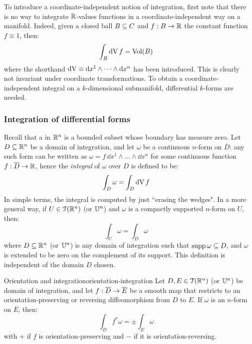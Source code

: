 To introduce a coordinate-independent notion of integration, first note that there is no way to integrate $ \mathbb{R} $-values functions in a coordinate-independent way on a manifold. Indeed, given a closed ball $ B \subseteq C $ and $ f : B \rightarrow \mathbb{R} $ the constant function $ f \equiv 1 $, then:
\begin{equation*}
  \int_B \mathrm{d} \mathrm{V} \, f = \operatorname{Vol}(B)
\end{equation*}
where the shorthand $ \mathrm{d} \mathrm{V} \equiv \mathrm{d} x^1 \wedge \dots \wedge \mathrm{d} x^n $ has been introduced.
This is clearly not invariant under coordinate transformations. To obtain a coordinate-independent integral on a $ k $-dimensional submanifold, differential $ k $-forms are needed.

\subsubsection{Integration of differential forms}

Recall that a  in $ \mathbb{R}^n $ is a bounded subset whose boundary has measure zero. Let $ D \subseteq \mathbb{R}^n $ be a domain of integration, and let $ \omega $ be a continuous $ n $-form on $ \overline{D} $: any such form can be written as $ \omega = f \, \dd x^1 \wedge \dots \wedge \dd x^n $ for some continuous function $ f : \overline{D} \rightarrow \mathbb{R} $, hence the \emph{integral} of $ \omega $ over $ D $ is defined to be:
\begin{equation*}
  \int_D \omega = \int_D \mathrm{d} \mathrm{V} \, f
\end{equation*}
In simple terms, the integral is computed by just ``erasing the wedges". In a more general way, if $ U \in \EuScript{T}(\mathbb{R}^n) $ (or $ \mathbb{U}^n $) and $ \omega $ is a compactly supported $ n $-form on $ U $, then:
\begin{equation*}
  \int_U \omega = \int_D \omega
\end{equation*}
where $ D \subseteq \mathbb{R}^n $ (or $ \mathbb{U}^n $) is any domain of integration such that $ \operatorname{supp} \omega \subseteq D $, and $ \omega $ is extended to be zero on the complement of its support. This definition is independent of the domain $ D $ chosen.

\begin{proposition}{Orientation and integration}{orientation-integration}
  Let $ D , E \in \EuScript{T}(\mathbb{R}^n) $ (or $ \mathbb{U}^n $) be domain of integration, and let $ f : \overline{D} \rightarrow \overline{E} $ be a smooth map that restricts to an orientation-preserving or reversing diffeomorphism from $ D $ to $ E $. If $ \omega $ is an $ n $-form on $ \overline{E} $, then:
  \begin{equation*}
    \int_D f^* \omega = \pm \int_E \omega
  \end{equation*}
  with $ + $ if $ f $ is orientation-preserving and $ - $ if it is orientation-reversing.
\end{proposition}

